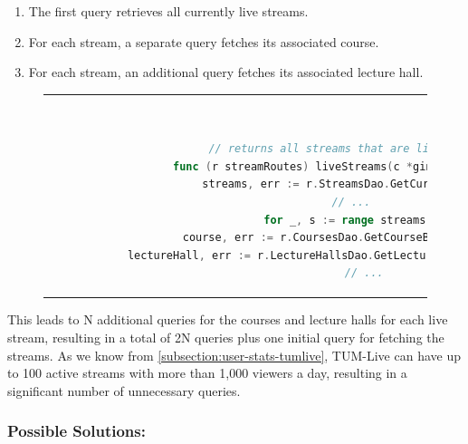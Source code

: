 \begin{enumerate}
    \item The first query retrieves all currently live streams.
    \item For each stream, a separate query fetches its associated course.
    \item For each stream, an additional query fetches its associated lecture hall.
\end{enumerate}
\begin{figure}[htpb]
  \begin{tabular}{c}
  \ \small \begin{lstlisting}[language=Go]
    // returns all streams that are live
    func (r streamRoutes) liveStreams(c *gin.Context) {
        streams, err := r.StreamsDao.GetCurrentLive(c)
        // ...
        for _, s := range streams {
            course, err := r.CoursesDao.GetCourseById(c, s.CourseID)
            lectureHall, err := r.LectureHallsDao.GetLectureHallByID(s.LectureHallID)
            // ...
    \end{lstlisting}
  \end{tabular}
  \label{fig:n+1-example-livestreams}
\end{figure}

This leads to N additional queries for the courses and lecture halls for each live stream, resulting in a total of 2N queries plus one initial query for fetching the streams. As we know from \autoref{subsection:user-stats-tumlive}, TUM-Live can have up to 100 active streams with more than 1,000 viewers a day, resulting in a significant number of unnecessary queries.

\subsubsection{Possible Solutions:}

